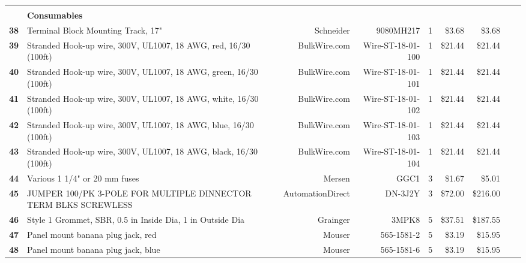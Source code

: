 \begin{table}[!htp]
{\begin{tabular}{llrrrrrrr}
			\textbf{}      & \textbf{}                                                                        &                   &                   &    &            &            \\
			\textbf{}      & \textbf{Consumables}                                                             &                   &                   &    &            &            \\
			\textbf{38}    & Terminal Block Mounting Track, 17"                                               & Schneider         & 9080MH217         & 1  & \$3.68     & \$3.68     \\
			\textbf{39}    & Stranded Hook-up wire, 300V, UL1007, 18 AWG, red, 16/30 (100ft)                  & BulkWire.com      & Wire-ST-18-01-100 & 1  & \$21.44    & \$21.44    \\
			\textbf{40}    & Stranded Hook-up wire, 300V, UL1007, 18 AWG, green, 16/30 (100ft)                & BulkWire.com      & Wire-ST-18-01-101 & 1  & \$21.44    & \$21.44    \\
			\textbf{41}    & Stranded Hook-up wire, 300V, UL1007, 18 AWG, white, 16/30 (100ft)                & BulkWire.com      & Wire-ST-18-01-102 & 1  & \$21.44    & \$21.44    \\
			\textbf{42}    & Stranded Hook-up wire, 300V, UL1007, 18 AWG, blue, 16/30 (100ft)                 & BulkWire.com      & Wire-ST-18-01-103 & 1  & \$21.44    & \$21.44    \\
			\textbf{43}    & Stranded Hook-up wire, 300V, UL1007, 18 AWG, black, 16/30 (100ft)                & BulkWire.com      & Wire-ST-18-01-104 & 1  & \$21.44    & \$21.44    \\
			\textbf{44}    & Various 1 1/4" or 20 mm fuses                                                    & Mersen            & GGC1              & 3  & \$1.67     & \$5.01     \\
			\textbf{45}    & JUMPER 100/PK 3-POLE FOR MULTIPLE DINNECTOR TERM BLKS SCREWLESS                  & AutomationDirect  & DN-3J2Y           & 3  & \$72.00    & \$216.00   \\
			\textbf{46}    & Style 1 Grommet, SBR, 0.5 in Inside Dia, 1 in Outside Dia                        & Grainger          & 3MPK8             & 5  & \$37.51    & \$187.55   \\
			\textbf{47}    & Panel mount banana plug jack, red                                                & Mouser            & 565-1581-2        & 5  & \$3.19     & \$15.95    \\
			\textbf{48}    & Panel mount banana plug jack, blue                                               & Mouser            & 565-1581-6        & 5  & \$3.19     & \$15.95    \\

\end{tabular}}
\end{table}
